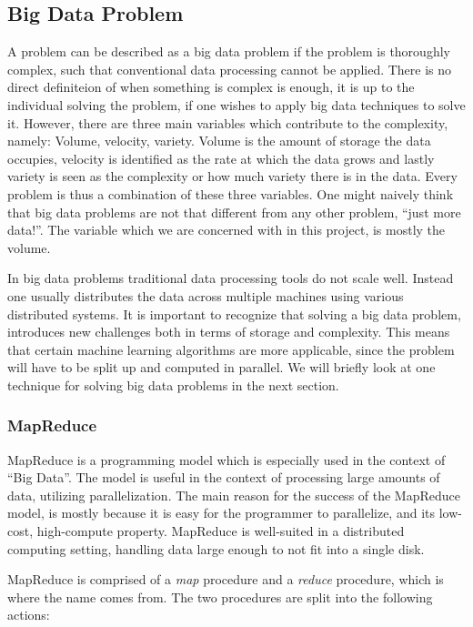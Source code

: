 \subsection{Big Data Problem}
A problem can be described as a big data problem if the problem is thoroughly complex, such that conventional data processing cannot be applied. There is no direct definiteion of when something is complex is enough, it is up to the individual solving the problem, if one wishes to apply big data techniques to solve it. However, there are three main variables which contribute to the complexity, namely: Volume, velocity, variety. Volume is the amount of storage the data occupies, velocity is identified as the rate at which the data grows and lastly variety is seen as the complexity or how much variety there is in the data. 
Every problem is thus a combination of these three variables. One might naively think that big data problems are not that different from any other problem, ``just more data!''. The variable which we are concerned with in this project, is mostly the volume. 

In big data problems traditional data processing tools do not scale well. Instead one usually distributes the data across multiple machines using various distributed systems. It is important to recognize that solving a big data problem, introduces new challenges both in terms of storage and complexity. This means that certain machine learning algorithms are more applicable, since the problem will have to be split up and computed in parallel.  We will briefly look at one technique for solving big data problems in the next section.

\subsubsection{MapReduce} %
\label{sec:mapreduce_programming_model}

MapReduce is a programming model which is especially used in the context of ``Big Data''. The model is useful in the context of processing large amounts of data, utilizing parallelization. The main reason for the success of the MapReduce model, is mostly because it is easy for the programmer to parallelize, and its low-cost, high-compute property. MapReduce is well-suited in a distributed computing setting, handling data large enough to not fit into a single disk.

MapReduce is comprised of a \emph{map} procedure and a \emph{reduce} procedure, which is where the name comes from. The two procedures are split into the following actions:


